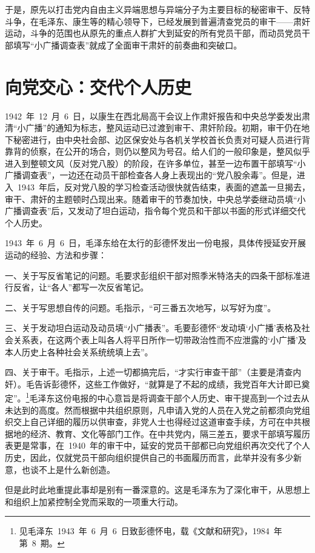 于是，原先以打击党内自由主义异端思想与异端分子为主要目标的秘密审干、反特斗争，在毛泽东、康生等的精心领导下，已经发展到普遍清查党员的审干——肃奸运动，斗争的范围也从原先的重点人群扩大到延安的所有党员干部，而动员党员干部填写“小广播调查表”就成了全面审干肃奸的前奏曲和突破口。

\section{向党交心：交代个人历史}

1942~年~12~月~6~日，以康生在西北局高干会议上作肃奸报告和中央总学委发出肃清“小广播”的通知为标志，整风运动已过渡到审干、肃奸阶段。初期，审干仍在地下秘密进行，由中央社会部、边区保安处与各机关学校首长负责对可疑人员进行背靠背的侦察，在公开的场合，则仍以整风为号召。给人们的一般印象是，整风似乎进入到整顿文风（反对党八股）的阶段，在许多单位，甚至一边布置干部填写“小广播调查表”，一边还在动员干部检查各人身上表现出的“党八股余毒”。但是，进入~1943~年后，反对党八股的学习检查活动很快就告结束，表面的遮盖一旦揭去，审干、肃奸的主题顿时凸现出来。随着审干的节奏加快，中央总学委继动员填“小广播调查表”后，又发动了坦白运动，指令每个党员和干部以书面的形式详细交代个人历史。

1943~年~6~月~6~日，毛泽东给在太行的彭德怀发出一份电报，具体传授延安开展运动的经验、方法和步骤：

一、关于写反省笔记的问题。毛要求彭组织干部对照季米特洛夫的四条干部标准进行反省，让“各人”都写一次反省笔记。

二、关于写思想自传的问题。毛指示，“可三番五次地写，以写好为度”。

三、关于发动坦白运动及动员填“小广播表”。毛要彭德怀“发动填‘小广播’表格及社会关系表，在这两个表上叫各人将平日所作一切带政治性而不应泄露的‘小广播’及本人历史上各种社会关系统统填上去”。

四、关于审干。毛指示，上述一切都搞完后，“才实行审查干部”（主要是清查内奸）。毛告诉彭德怀，这些工作做好，“就算是了不起的成绩，我党百年大计即已奠定”。\footnote{见毛泽东~1943~年~6~月~6~日致彭德怀电，载《文献和研究》，1984~年第~8~期。}毛泽东这份电报的中心意旨是将调查干部个人历史、审干提高到一个过去从未达到的高度。然而根据中共组织原则，凡申请入党的人员在入党之前都须向党组织交上自己详细的履历以供审查，非党人士也得经过这道审查手续，方可在中共根据地的经济、教育、文化等部门工作。在中共党内，隔三差五，要求干部填写履历表更是常事，在~1940~年的审干中，延安的党员干部都已向党组织再次交代了个人历史，因此，仅就党员干部向组织提供自己的书面履历而言，此举并没有多少新意，也谈不上是什么新创造。

但是此时此地重提此事却是别有一番深意的。这是毛泽东为了深化审干，从思想上和组织上加紧控制全党而采取的一项重大行动。


